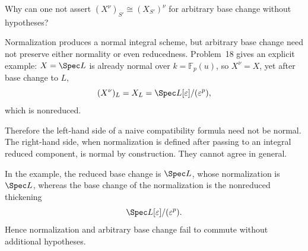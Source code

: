\begin{problem}\label{prob:vi28-19}
Why can one not assert \((X^\nu)_{S'}\cong (X_{S'})^\nu\) for arbitrary base change without hypotheses?

\end{problem}

\ifdefined\FullProblemDossiers
\begin{solution}
Normalization produces a normal integral scheme, but arbitrary base change need not preserve either normality or even reducedness. Problem~18 gives an explicit example: \(X=\Spec L\) is already normal over
\(k=\mathbb F_p(u)\), so \(X^\nu=X\), yet after base change to \(L\),
\[
(X^\nu)_L=X_L=\Spec L[\varepsilon]/(\varepsilon^p),
\]
which is nonreduced.

Therefore the left-hand side of a naive compatibility formula need not be normal. The right-hand side, when normalization is defined after passing to an integral reduced component, is normal by construction. They cannot agree in general.

In the example, the reduced base change is \(\Spec L\), whose normalization is \(\Spec L\), whereas the base change of the normalization is the nonreduced thickening
\[
\Spec L[\varepsilon]/(\varepsilon^p).
\]
Hence normalization and arbitrary base change fail to commute without additional hypotheses.
\end{solution}
\fi
